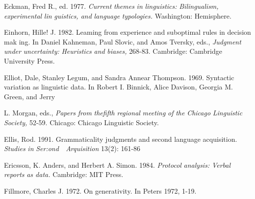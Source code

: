 \begin{styleStandard}
Eckman, Fred R., ed. 1977. \textit{Current}\textit{ }\textit{themes}\textit{ }\textit{in}\textit{ }\textit{linguistics:}\textit{ }\textit{Bilingualism,}\textit{ }\textit{experimental}\textit{ }\textit{lin\-}\textit{ }\textit{guistics, and}\textit{ }\textit{language}\textit{ }\textit{typologies.}\textit{ }Washington: Hemisphere.
\end{styleStandard}


\begin{styleStandard}
Einhorn, Hille! J. 1982. Leaming from experience and suboptimal rules in decision mak\- ing. In Daniel Kahneman, Paul Slovic, and Amos Tversky, eds., \textit{Judgment}\textit{ }\textit{under}\textit{ }\textit{uncertainty:}\textit{ }\textit{Heuristics}\textit{ }\textit{and}\textit{ }\textit{biases,}\textit{ }268-83. Cambridge: Cambridge University Press.
\end{styleStandard}


\begin{styleStandard}
Elliot, Dale, Stanley Legum, and Sandra Annear Thompson. 1969. Syntactic variation as linguistic data. In Robert I. Binnick, Alice Davison, Georgia M. Green, and Jerry
\end{styleStandard}


\begin{styleStandard}
L. Morgan, eds., \textit{Papers}\textit{ }\textit{from}\textit{ }\textit{thefifth}\textit{ }\textit{regional}\textit{ }\textit{meeting}\textit{ }\textit{of}\textit{ }\textit{the}\textit{ }\textit{Chicago}\textit{ }\textit{Linguistic}\textit{ }\textit{Society,}\textit{ }52-59. Chicago: Chicago Linguistic Society.
\end{styleStandard}


\begin{styleStandard}
Ellis, Rod. 1991. Grammaticality judgments and second language acquisition. \textit{Studies}\textit{ }\textit{in}\textit{ }\textit{Ser:ond\ \ }\textit{Arquisition}\textit{ }13(2): 161{}-86
\end{styleStandard}


\begin{styleStandard}
Ericsson, K. Anders, and Herbert A. Simon. 1984. \textit{Protocol}\textit{ }\textit{analysis:}\textit{ }\textit{Verbal}\textit{ }\textit{reports}\textit{ }\textit{as data.}\textit{ }Cambridge: MIT Press.
\end{styleStandard}


\begin{styleStandard}
Fillmore, Charles J. 1972. On generativity. In Peters 1972, 1-19.
\end{styleStandard}


